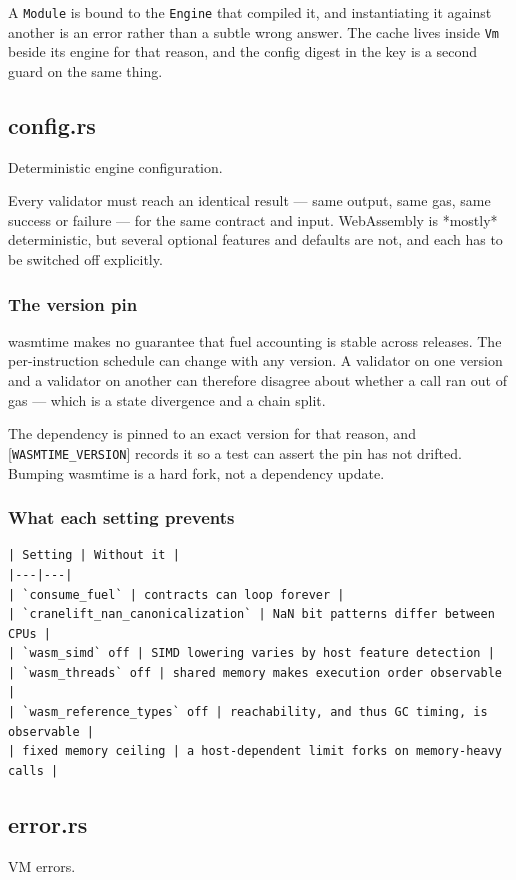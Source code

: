 \documentclass[11pt,a4paper]{article}
\begin{document}
A \texttt{Module} is bound to the \texttt{Engine} that compiled it, and instantiating it
against another is an error rather than a subtle wrong answer. The cache
lives inside \texttt{Vm} beside its engine for that reason, and the config digest in
the key is a second guard on the same thing.

\subsection{config.rs}
Deterministic engine configuration.

Every validator must reach an identical result — same output, same gas, same
success or failure — for the same contract and input. WebAssembly is
*mostly* deterministic, but several optional features and defaults are not,
and each has to be switched off explicitly.

\subsubsection{The version pin}

wasmtime makes no guarantee that fuel accounting is stable across releases.
The per-instruction schedule can change with any version. A validator on one
version and a validator on another can therefore disagree about whether a
call ran out of gas — which is a state divergence and a chain split.

The dependency is pinned to an exact version for that reason, and
[\texttt{WASMTIME\_VERSION}] records it so a test can assert the pin has not drifted.
Bumping wasmtime is a hard fork, not a dependency update.

\subsubsection{What each setting prevents}

\begin{verbatim}
| Setting | Without it |
|---|---|
| `consume_fuel` | contracts can loop forever |
| `cranelift_nan_canonicalization` | NaN bit patterns differ between CPUs |
| `wasm_simd` off | SIMD lowering varies by host feature detection |
| `wasm_threads` off | shared memory makes execution order observable |
| `wasm_reference_types` off | reachability, and thus GC timing, is observable |
| fixed memory ceiling | a host-dependent limit forks on memory-heavy calls |
\end{verbatim}

\subsection{error.rs}
VM errors.
\end{document}
